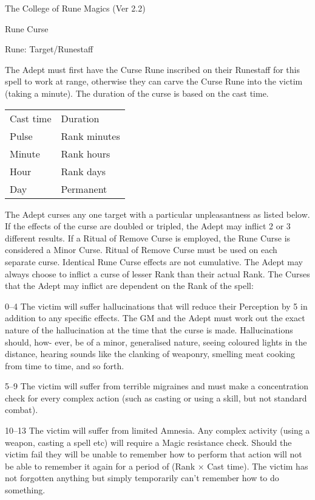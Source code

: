 \begin{Chapter}{The College of Rune Magics (Ver 2.2)}
\begin{spell}[S-6]{Rune Curse}

Rune: Target/Runestaff 
\begin{effects}
The Adept must first have the Curse Rune inscribed on their Runestaff
for this spell to work at range, otherwise they can carve the Curse
Rune into the victim (taking a minute).  The duration of the curse is
based on the cast time.

\begin{tabularx}{\columnwidth}{ll}
Cast time	& Duration  \\
Pulse		& Rank minutes  \\
Minute		& Rank hours \\
Hour		& Rank days \\
Day		& Permanent \\
\end{tabularx}

The Adept curses any one target with a particular unpleasantness as
listed below. If the effects of the curse are doubled or tripled, the
Adept may inflict 2 or 3 different results.  If a Ritual of Remove
Curse is employed, the Rune Curse is considered a Minor Curse.  Ritual
of Remove Curse must be used on each separate curse.  Identical Rune
Curse effects are not cumulative. The Adept may always choose to
inflict a curse of lesser Rank than their actual Rank. The Curses that
the Adept may inflict are dependent on the Rank of the spell:

\begin{Description}
\item[0--4] The victim will suffer hallucinations that will reduce
  their Perception by 5 in addition to any specific effects. The GM
  and the Adept must work out the exact nature of the hallucination at
  the time that the curse is made. Hallucinations should, how- ever,
  be of a minor, generalised nature, seeing coloured lights in the
  distance, hearing sounds like the clanking of weaponry, smelling
  meat cooking from time to time, and so forth.

\item[5--9] The victim will suffer from terrible migraines and must
  make a concentration check for every complex action (such as casting
  or using a skill, but not standard combat).

\item[10--13] The victim will suffer from limited Amnesia. Any complex
  activity (using a weapon, casting a spell etc) will require a Magic
  resistance check.  Should the victim fail they will be unable to
  remember how to perform that action will not be able to remember it
  again for a period of (Rank × Cast time).  The victim has not
  forgotten anything but simply temporarily can’t remember how to do
  something.


\end{Description}
\end{effects}
\end{spell}
\end{Chapter}
